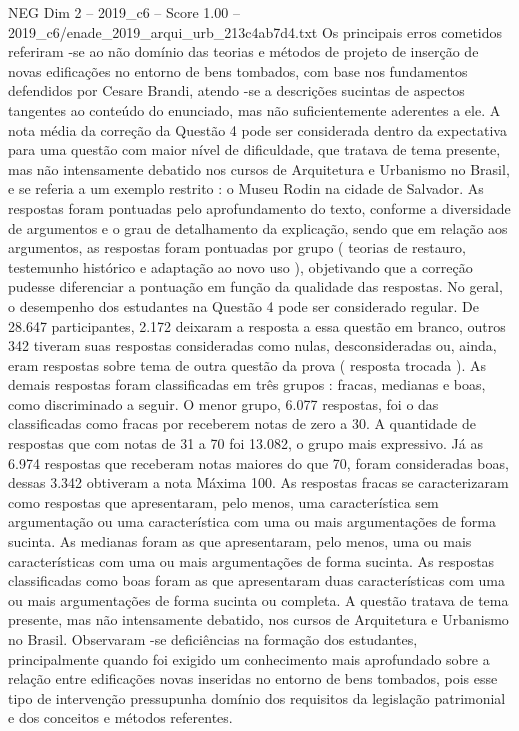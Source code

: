 \begin{textsample}{NEG Dim 2 – 2019\_c6 – Score 1.00 – 2019\_c6/enade\_2019\_arqui\_urb\_213c4ab7d4.txt}
Os principais erros cometidos referiram -se ao não domínio das teorias e métodos de projeto de inserção de novas edificações no entorno de bens tombados, com base nos fundamentos defendidos por Cesare Brandi, atendo -se a descrições sucintas de aspectos tangentes ao conteúdo do enunciado, mas não suficientemente aderentes a ele.
A nota média da correção da Questão 4 pode ser considerada dentro da expectativa para uma questão com maior nível de dificuldade, que tratava de tema presente, mas não intensamente debatido nos cursos de Arquitetura e Urbanismo no Brasil, e se referia a um exemplo restrito : o Museu Rodin na cidade de Salvador.
As respostas foram pontuadas pelo aprofundamento do texto, conforme a diversidade de argumentos e o grau de detalhamento da explicação, sendo que em relação aos argumentos, as respostas foram pontuadas por grupo ( teorias de restauro, testemunho histórico e adaptação ao novo uso ), objetivando que a correção pudesse diferenciar a pontuação em função da qualidade das respostas.
No geral, o desempenho dos estudantes na Questão 4 pode ser considerado regular.
De 28.647 participantes, 2.172 deixaram a resposta a essa questão em branco, outros 342 tiveram suas respostas consideradas como nulas, desconsideradas ou, ainda, eram respostas sobre tema de outra questão da prova ( resposta trocada ).
As demais respostas foram classificadas em três grupos : fracas, medianas e boas, como discriminado a seguir.
O menor grupo, 6.077 respostas, foi o das classificadas como fracas por receberem notas de zero a 30.
A quantidade de respostas que com notas de 31 a 70 foi 13.082, o grupo mais expressivo.
Já as 6.974 respostas que receberam notas maiores do que 70, foram consideradas boas, dessas 3.342 obtiveram a nota Máxima 100.
As respostas fracas se caracterizaram como respostas que apresentaram, pelo menos, uma característica sem argumentação ou uma característica com uma ou mais argumentações de forma sucinta.
As medianas foram as que apresentaram, pelo menos, uma ou mais características com uma ou mais argumentações de forma sucinta.
As respostas classificadas como boas foram as que apresentaram duas características com uma ou mais argumentações de forma sucinta ou completa.
A questão tratava de tema presente, mas não intensamente debatido, nos cursos de Arquitetura e Urbanismo no Brasil.
Observaram -se deficiências na formação dos estudantes, principalmente quando foi exigido um conhecimento mais aprofundado sobre a relação entre edificações novas inseridas no entorno de bens tombados, pois esse tipo de intervenção pressupunha domínio dos requisitos da legislação patrimonial e dos conceitos e métodos referentes.

\end{textsample}
